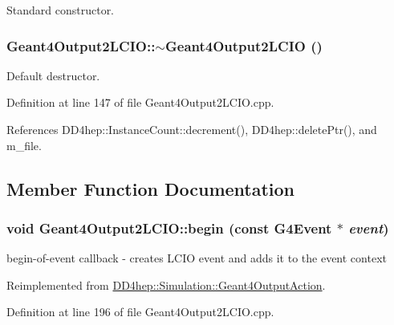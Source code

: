 Standard constructor. \hypertarget{class_d_d4hep_1_1_simulation_1_1_geant4_output2_l_c_i_o_a7d9a334e6ba95f422f8ecf97c0593fa6}{
\subsubsection[{$\sim$Geant4Output2LCIO}]{\setlength{\rightskip}{0pt plus 5cm}Geant4Output2LCIO::$\sim$Geant4Output2LCIO ()}}
\label{class_d_d4hep_1_1_simulation_1_1_geant4_output2_l_c_i_o_a7d9a334e6ba95f422f8ecf97c0593fa6}


Default destructor. 

Definition at line 147 of file Geant4Output2LCIO.cpp.

References DD4hep::InstanceCount::decrement(), DD4hep::deletePtr(), and m\_\-file.

\subsection{Member Function Documentation}
\hypertarget{class_d_d4hep_1_1_simulation_1_1_geant4_output2_l_c_i_o_a36b7ecdf04169c4597bae18e021b60ea}{
\subsubsection[{begin}]{\setlength{\rightskip}{0pt plus 5cm}void Geant4Output2LCIO::begin (const G4Event $\ast$ {\em event})}}
\label{class_d_d4hep_1_1_simulation_1_1_geant4_output2_l_c_i_o_a36b7ecdf04169c4597bae18e021b60ea}


begin-\/of-\/event callback -\/ creates LCIO event and adds it to the event context 

Reimplemented from \hyperlink{class_d_d4hep_1_1_simulation_1_1_geant4_output_action_afaad36616c890ac39e80421d340efd47}{DD4hep::Simulation::Geant4OutputAction}.

Definition at line 196 of file Geant4Output2LCIO.cpp.

